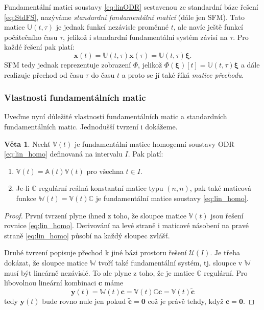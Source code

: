 \documentclass[a4paper, 12pt]{book}
\theoremstyle{definition}
\newtheorem{theorem}{Věta}[section]
\def\vc#1{\mathbf{\boldsymbol{#1}}}     %
\def\tn#1{{\mathbb{#1}}}    %
\def\df#1{\emph{#1}}
\begin{document}
Fundamentální matici soustavy \eqref{eq:linODR} sestavenou ze standardní báze řešení \eqref{eq:StdFS}, nazýváme \df{standardní fundamentální maticí} (dále jen SFM).
Tato matice $\tn U(t, \tau)$ je jednak funkcí nezávisle proměnné $t$, ale navíc ještě funkcí počátečního času $\tau$, jelikož i standardní 
fundamentální systém závisí na $\tau$. Pro každé řešení pak platí:
\[
   \vc x(t) = \tn U(t, \tau) \vc x(\tau) = \tn U (t,\tau) \vc\xi.
\]
SFM tedy jednak reprezentuje  zobrazení $\Phi$, jelikož $\Phi(\vc\xi)[t] = \tn U (t,\tau) \vc\xi$ a dále realizuje přechod od času $\tau$ do času $t$ 
a proto se jí také říká \df{matice přechodu}. 


\subsubsection{Vlastnosti fundamentálních matic}
Uveďme nyní důležité vlastnosti fundamentálních matic a standardních fundamentálních matic. Jednodušší tvrzení i dokážeme.
\begin{theorem}
    Nechť $\tn V(t)$ je fundamentální matice homogenní soustavy ODR \eqref{eq:lin_homo}
    definovaná na intervalu $I$. Pak platí:
    \begin{enumerate}
        \item $\dot{\tn V}(t) = {\tn A}(t){\tn V}(t)$ pro všechna $t\in I$.
        \item Je-li ${\tn C}$ regulární reálná konstantní matice typu $(n,n)$, pak také 
        maticová funkce ${\tn W}(t) = {\tn V}(t) {\tn C}$ je fundamentální matice 
        soustavy \eqref{eq:lin_homo}.
    \end{enumerate}
\end{theorem}
\begin{proof}
    První tvrzení plyne ihned z toho, že sloupce matice $\tn V(t)$ jsou řešení rovnice \eqref{eq:lin_homo}. 
    Derivování na levé straně i maticové násobení na pravé straně \eqref{eq:lin_homo}
    působí na každý sloupec zvlášť. 
    
    Druhé tvrzení popisuje přechod k jiné bázi prostoru řešení $\mathcal U(I)$. Je třeba dokázat, že sloupce matice $\tn W$ tvoří také fundamentální systém,
    tj. sloupce v $\tn W$ musí být lineárně nezávislé. To ale plyne z toho, že je matice $\tn C$ regulární. Pro libovolnou lineární kombinaci $\vc c$ máme
    \[
       \vc y(t) = \tn W(t) \vc c = \tn V(t) \tn C \vc c = \tn V(t) \tilde{\vc c}
    \]
    tedy $\vc y(t)$ bude rovno nule jen pokud $\tilde{\vc c}=\vc 0$ což je právě tehdy, když $\vc c = \vc 0$.
\end{proof}
\end{document}
